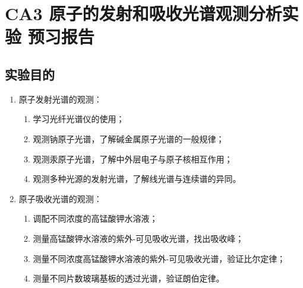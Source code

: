 \documentclass[dvipsnames, svgnames,a4paper,11pt]{article}
\begin{document}
	\section{CA3 \quad 原子的发射和吸收光谱观测分析实验 \quad\heiti 预习报告}
		
	\subsection{实验目的}
		\begin{enumerate}
			\item 原子发射光谱的观测：
				\begin{enumerate}
					\item 学习光纤光谱仪的使用；
					\item 观测钠原子光谱，了解碱金属原子光谱的一般规律；
					\item 观测汞原子光谱，了解中外层电子与原子核相互作用；
					\item 观测多种光源的发射光谱，了解线光谱与连续谱的异同。
				\end{enumerate}
			\item  原子吸收光谱的观测：
				\begin{enumerate}
					\item 调配不同浓度的高锰酸钾水溶液；
					\item 测量高锰酸钾水溶液的紫外-可见吸收光谱，找出吸收峰；
					\item 测量不同浓度高锰酸钾水溶液的紫外-可见吸收光谱，验证比尔定律；
					\item 测量不同片数玻璃基板的透过光谱，验证朗伯定律。
				\end{enumerate}
		\end{enumerate}
		
	
\end{document}
